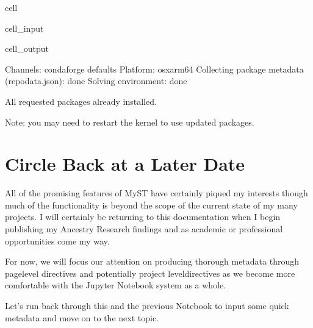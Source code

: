 \documentclass[letterpaper,12pt,english]{sphinxmanual}
\begin{document}
\begin{sphinxuseclass}{cell}
\begin{sphinxuseclass}{cell_input}
\begin{sphinxVerbatim}[commandchars=\\\{\}]
    
\end{sphinxVerbatim}

\end{sphinxuseclass}
\begin{sphinxuseclass}{cell_output}
\begin{sphinxVerbatim}[commandchars=\\\{\}]
Channels:
 \PYGZhy{} conda\PYGZhy{}forge
 \PYGZhy{} defaults
Platform: osx\PYGZhy{}arm64
Collecting package metadata (repodata.json): done
Solving environment: done

\PYGZsh{} All requested packages already installed.


Note: you may need to restart the kernel to use updated packages.
\end{sphinxVerbatim}

\end{sphinxuseclass}
\end{sphinxuseclass}

\section{Circle Back at a Later Date}
\label{\detokenize{notebooks/02-myst.integration:circle-back-at-a-later-date}}
\sphinxAtStartPar
All of the promising features of MyST have certainly piqued my interests though much of the functionality is beyond the scope of the current state of my many projects. I will certainly be returning to this documentation when I begin publishing my Ancestry Research findings and as academic or professional opportunities come my way.

\sphinxAtStartPar
For now, we will focus our attention on producing thorough metadata through page\sphinxhyphen{}level directives and potentially project level\sphinxhyphen{}directives as we become more comfortable with the Jupyter Notebook system as a whole.

\sphinxAtStartPar
Let’s run back through this and the previous Notebook to input some quick metadata and move on to the next topic.

\sphinxstepscope
\end{document}
